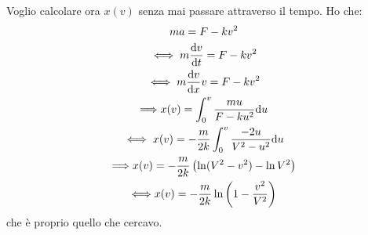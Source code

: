 \documentclass[../main.tex]{subfiles}
\begin{document}
Voglio calcolare ora $x(v)$ senza mai passare attraverso il tempo. Ho che:
\begin{gather*}
	m a=F-kv^2 \\
	\iff m \frac{\mathrm{d} v}{\mathrm{d} t}= F-kv^2 \\
	\iff m \frac{\mathrm{d} v}{\mathrm{d} x} v= F-kv^2 \\
	\Longrightarrow x(v)= \int _0^v \frac{mu}{F-ku^2}\mathrm{d} u \\
	\iff x(v)= -\frac{m}{2k}\int_0^v \frac{-2u}{V^2-u^2} \mathrm{d} u \\
	\Longrightarrow x(v)= -\frac{m}{2k} \left( \ln(V^2-v^2)-\ln V^2 \right) \\
	\Longleftrightarrow x(v)= -\frac{m}{2k}\ln\left (1-\frac{v^2}{V^2}\right)
\end{gather*}
che è proprio quello che cercavo.
\end{document}
